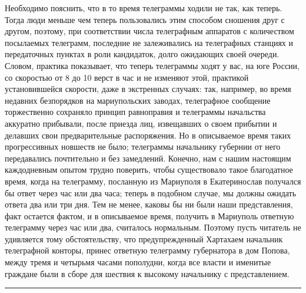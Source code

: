 \documentclass[a4paper,20pt]{report}
\begin{document}
Необходимо пояснить, что в то время телеграммы ходили не так, как теперь. 
Тогда люди меньше чем теперь пользовались этим способом сношения друг с другом,
поэтому, при соответствии числа телеграфным аппаратов с
количеством посылаемых телеграмм, последние не залеживались на телеграфных станциях 
и передаточных пунктах в роли кандидаток, долго ожидающих своей очереди.
Словом, практика показывает, что теперь телеграммы ходят у вас, на юге России, 
со скоростью от 8 до 10 верст в час и не изменяют этой, практикой установившейся скорости, 
даже в экстренных случаях: так, например, во время недавних безпорядков на 
мариупольских заводах, телеграфное сообщение торжественно сохраняло
принцип равноправия и телеграммы начальства аккуратно
прибывали, после приезда лиц, извещавших о своем прибытии
и делавших свои предварительные распоряжения. Но
в описываемое время таких прогрессивных новшеств не
было; телеграммы начальнику губернии от него передавались 
почтительно и без замедлений. Конечно, нам с нашим настоящим каждодневным 
опытом трудно поверить,
чтобы существовало такое благодатное время, когда на телеграмму, посланную из Мариуполя в 
Екатеринослав получался бы ответ через час или два часа; 
теперь в подобном случае, мы должны ожидать ответа два или три
дня. Тем не менее, каковы бы ни были наши представления,
факт остается фактом, и в описываемое время, получить
в Мариуполь ответную телеграмму через час или два,
считалось нормальным. Поэтому пусть читатель не удивляется 
тому обстоятельству, что предупрежденный Хартахаем
начальник телеграфной конторы, принес ответную телеграмму 
губернатора в дом Попова, между тремя и четырьмя
часами пополудни, когда все власти и именитые граждане
были в сборе для шествия к высокому начальнику с
представлением.

\par\noindent\rule{\textwidth}{0.4pt}
\end{document}
